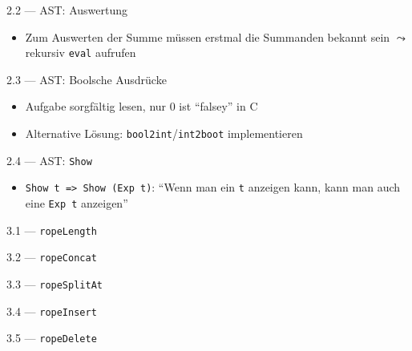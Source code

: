 \documentclass{beamer}
\begin{document}
\begin{frame}{2.2 --- AST: Auswertung}

        \begin{itemize}
          \item Zum Auswerten der Summe müssen erstmal die Summanden bekannt sein $\leadsto$ rekursiv \texttt{eval} aufrufen
        \end{itemize}
\end{frame}

\begin{frame}{2.3 --- AST: Boolsche Ausdrücke}

	\begin{itemize}
		\item Aufgabe sorgfältig lesen, nur 0 ist \enquote{falsey} in C
                \item Alternative Lösung: \texttt{bool2int}/\texttt{int2boot} implementieren
	\end{itemize}
\end{frame}

\begin{frame}{2.4 --- AST: \texttt{Show}}

	\begin{itemize}
		\item \texttt{Show t => Show (Exp t)}: \enquote{Wenn man ein \texttt{t} anzeigen kann, kann man auch eine \texttt{Exp t} anzeigen}
	\end{itemize}
\end{frame}

\begin{frame}{3.1 --- \texttt{ropeLength}}
\end{frame}

\begin{frame}{3.2 --- \texttt{ropeConcat}}
\end{frame}

\begin{frame}{3.3 --- \texttt{ropeSplitAt}}
\end{frame}

\begin{frame}{3.4 --- \texttt{ropeInsert}}
\end{frame}

\begin{frame}{3.5 --- \texttt{ropeDelete}}
\end{frame}
\end{document}
